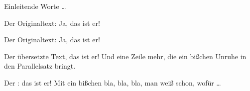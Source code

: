 \documentclass{book}
\begin{document}
\noeledsec
Einleitende Worte \dots
\begin{pages}
  \begin{Leftside}
    \beginnumbering

    Der Originaltext: \blindtext[2] Ja, das ist er!
    \pend


    Der Originaltext: \blindtext[3] Ja, das ist er!
    \pend
    \endnumbering
  \end{Leftside}

  \begin{Rightside}
    \beginnumbering

    Der übersetzte Text, das ist er! \blindtext[2] Und eine Zeile mehr, die ein bißchen Unruhe in den Parallelsatz bringt.

    \pend


    Der : das ist er! \blindtext[3] Mit ein bißchen bla, bla, bla, man weiß schon, wofür \dots
    \pend

    \endnumbering
  \end{Rightside}
\end{pages}
\Pages
\end{document}
